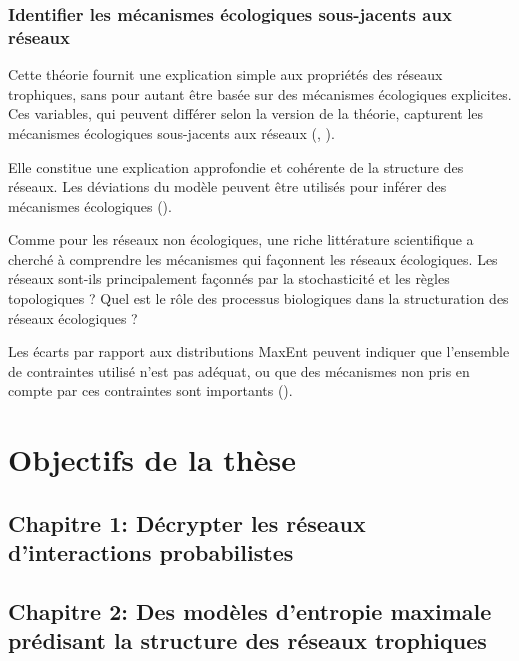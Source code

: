\subsubsection{Identifier les mécanismes écologiques sous-jacents aux réseaux} 

Cette théorie
fournit une explication simple aux propriétés des réseaux trophiques, sans pour
autant être basée sur des mécanismes écologiques explicites. Ces
variables, qui peuvent différer selon la version de la théorie, capturent les
mécanismes écologiques sous-jacents aux réseaux (\cite{White2012Characterizing},
\cite{McGill2010Mechanisms}).  

Elle constitue une explication approfondie et
cohérente de la structure des réseaux. Les déviations du modèle peuvent être
utilisés pour inférer des mécanismes écologiques (\cite{Harte2014Maximuma}).

Comme pour les réseaux non écologiques, une riche littérature scientifique a
cherché à comprendre les mécanismes qui façonnent les réseaux écologiques. Les
réseaux sont-ils principalement façonnés par la stochasticité et les règles
topologiques ? Quel est le rôle des processus biologiques dans la structuration
des réseaux écologiques ?

Les écarts par rapport aux distributions MaxEnt peuvent indiquer que l'ensemble
de contraintes utilisé n'est pas adéquat, ou que des mécanismes non pris en
compte par ces contraintes sont importants (\cite{Harte2014Maximum}).


\section{Objectifs de la thèse} 

\subsection{Chapitre 1: Décrypter les réseaux d'interactions probabilistes} 

\subsection{Chapitre 2: Des modèles d'entropie maximale prédisant la structure des réseaux trophiques} 

\endinput
